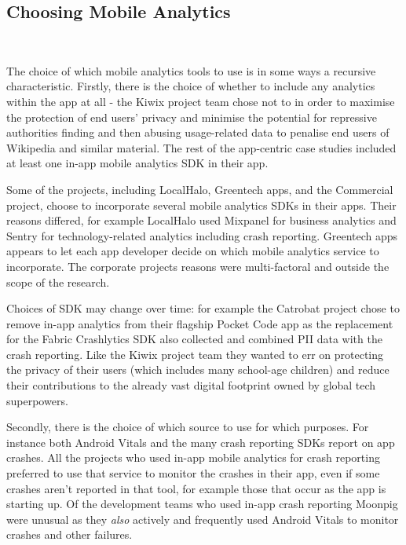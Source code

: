 \subsection{Choosing Mobile Analytics}~\label{aiu-choosing-mobile-analytics-section}

The choice of which mobile analytics tools to use is in some ways a recursive characteristic. Firstly, there is the choice of whether to include any analytics within the app at all - the Kiwix project team chose not to in order to maximise the protection of end users' privacy and minimise the potential for repressive authorities finding and then abusing usage-related data to penalise end users of Wikipedia and similar material. The rest of the app-centric case studies included at least one in-app mobile analytics SDK in their app.

Some of the projects, including LocalHalo, Greentech apps, and the Commercial project, choose to incorporate several mobile analytics SDKs in their apps. Their reasons differed, for example LocalHalo used Mixpanel for business analytics and Sentry for technology-related analytics including crash reporting. Greentech apps appears to let each app developer decide on which mobile analytics service to incorporate. The corporate projects reasons were multi-factoral and outside the scope of the research.

Choices of SDK may change over time: for example the Catrobat project chose to remove in-app analytics from their flagship Pocket Code app as the replacement for the Fabric Crashlytics SDK also collected and combined PII data with the crash reporting. Like the Kiwix project team they wanted to err on protecting the privacy of their users (which includes many school-age children) and reduce their contributions to the already vast digital footprint owned by global tech superpowers.

Secondly, there is the choice of which source to use for which purposes. For instance both Android Vitals and the many crash reporting SDKs report on app crashes. All the projects who used in-app mobile analytics for crash reporting preferred to use that service to monitor the crashes in their app, even if some crashes aren't reported in that tool, for example those that occur as the app is starting up. Of the development teams who used in-app crash reporting Moonpig were unusual as they \textit{also} actively and frequently used Android Vitals to monitor crashes and other failures.

